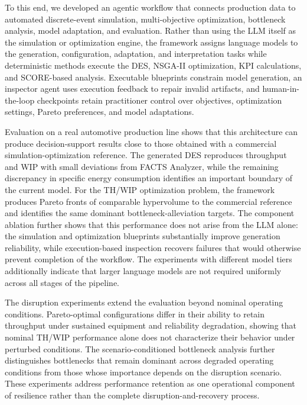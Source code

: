\documentclass[a4paper,fleqn]{cas-sc}
\begin{document}
    To this end, we developed an agentic workflow that connects production data to automated discrete-event simulation, multi-objective optimization, bottleneck analysis, model adaptation, and evaluation. Rather than using the LLM itself as the simulation or optimization engine, the framework assigns language models to the generation, configuration, adaptation, and interpretation tasks while deterministic methods execute the DES, NSGA-II optimization, KPI calculations, and SCORE-based analysis. Executable blueprints constrain model generation, an inspector agent uses execution feedback to repair invalid artifacts, and human-in-the-loop checkpoints retain practitioner control over objectives, optimization settings, Pareto preferences, and model adaptations.
 
 
    Evaluation on a real automotive production line shows that this architecture can produce decision-support results close to those obtained with a commercial simulation-optimization reference. The generated DES reproduces throughput and WIP with small deviations from FACTS Analyzer, while the remaining discrepancy in specific energy consumption identifies an important boundary of the current model. For the TH/WIP optimization problem, the framework produces Pareto fronts of comparable hypervolume to the commercial reference and identifies the same dominant bottleneck-alleviation targets. The component ablation further shows that this performance does not arise from the LLM alone: the simulation and optimization blueprints substantially improve generation reliability, while execution-based inspection recovers failures that would otherwise prevent completion of the workflow. The experiments with different model tiers additionally indicate that larger language models are not required uniformly across all stages of the pipeline.

    The disruption experiments extend the evaluation beyond nominal operating conditions. Pareto-optimal configurations differ in their ability to retain throughput under sustained equipment and reliability degradation, showing that nominal TH/WIP performance alone does not characterize their behavior under perturbed conditions. The scenario-conditioned bottleneck analysis further distinguishes bottlenecks that remain dominant across degraded operating conditions from those whose importance depends on the disruption scenario. These experiments address performance retention as one operational component of resilience rather than the complete disruption-and-recovery process.
\end{document}
